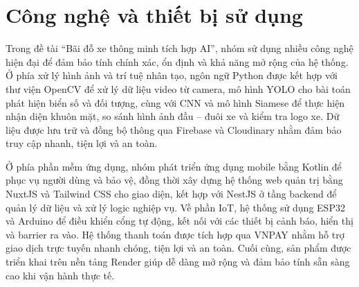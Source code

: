 \section{Công nghệ và thiết bị sử dụng}

Trong đề tài “Bãi đỗ xe thông minh tích hợp AI”, nhóm sử dụng nhiều công nghệ hiện đại để đảm bảo tính chính xác, ổn định và khả năng mở rộng của hệ thống. Ở phía xử lý hình ảnh và trí tuệ nhân tạo, ngôn ngữ Python được kết hợp với thư viện OpenCV để xử lý dữ liệu video từ camera, mô hình YOLO cho bài toán phát hiện biển số và đối tượng, cùng với CNN và mô hình Siamese để thực hiện nhận diện khuôn mặt, so sánh hình ảnh đầu – đuôi xe và kiểm tra logo xe. Dữ liệu được lưu trữ và đồng bộ thông qua Firebase và Cloudinary nhằm đảm bảo truy cập nhanh, tiện lợi và an toàn.

Ở phía phần mềm ứng dụng, nhóm phát triển ứng dụng mobile bằng Kotlin để phục vụ người dùng và bảo vệ, đồng thời xây dựng hệ thống web quản trị bằng NuxtJS và Tailwind CSS cho giao diện, kết hợp với NestJS ở tầng backend để quản lý dữ liệu và xử lý logic nghiệp vụ. Về phần IoT, hệ thống sử dụng ESP32 và Arduino để điều khiển cổng tự động, kết nối với các thiết bị cảnh báo, hiển thị và barrier ra vào. Hệ thống thanh toán được tích hợp qua VNPAY nhằm hỗ trợ giao dịch trực tuyến nhanh chóng, tiện lợi và an toàn. Cuối cùng, sản phẩm được triển khai trên nền tảng Render giúp dễ dàng mở rộng và đảm bảo tính sẵn sàng cao khi vận hành thực tế.